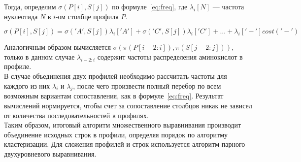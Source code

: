 Тогда, определим $\sigma(P[i], S[j])$ по формуле~\ref{eq:freq}, где $\lambda_i[N]$ --- частота нуклеотида $N$ в $i$-ом столбце профиля $P$.

\begin{equation}\label{eq:freq}
\sigma(P[i], S[j])=\sigma('A', S[j])\lambda_i['A']+\sigma('C', S[j])\lambda_i['C']+ \dots +\lambda_i['-']cost('-')
\end{equation}

Аналогичным образом вычисляется $\sigma(\pi(P[i-2:i]), \pi(S[j-2:j]))$, только в данном случае $\lambda_{i-2:i}$ содержит частоты распределения аминокислот в профиле.\\
\indent В случае объединения двух профилей необходимо рассчитать частоты для каждого из них $\lambda_i$ и $\lambda_j$, после чего произвести полный перебор по всем возможным вариантам сопоставления, как в формуле~\ref{eq:freq}. Результат вычислений нормируется, чтобы счет за сопоставление столбцов никак не зависел от количества последовательностей в профилях.\\
\indent Таким образом, итоговый алгоритм множественного выравнивания производит объединение исходных строк в профили, определяя порядок по алгоритму кластеризации. Для сложения профилей и строк используется алгоритм парного двухуровневого выравнивания.